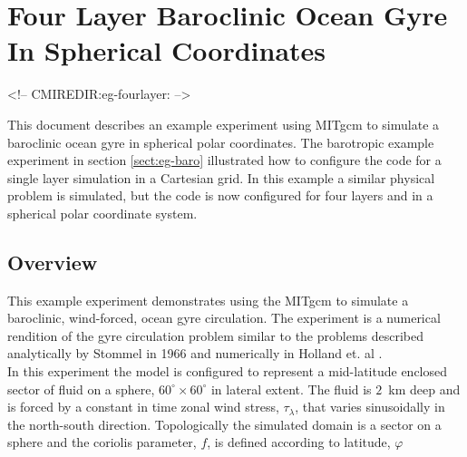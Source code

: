 
\section[Baroclinic Gyre MITgcm Example]{Four Layer Baroclinic Ocean Gyre In Spherical Coordinates}
\label{www:tutorials}
\label{sect:eg-fourlayer}
\begin{rawhtml}
<!-- CMIREDIR:eg-fourlayer: -->
\end{rawhtml}


%
%

This document describes an example experiment using MITgcm
to simulate a baroclinic ocean gyre in spherical
polar coordinates. The barotropic
example experiment in section \ref{sect:eg-baro}
illustrated how to configure the code for a single layer 
simulation in a Cartesian grid. In this example a similar physical problem
is simulated, but the code is now configured
for four layers and in a spherical polar coordinate system.

\subsection{Overview}
\label{www:tutorials}

This example experiment demonstrates using the MITgcm to simulate
a baroclinic, wind-forced, ocean gyre circulation. The experiment 
is a numerical rendition of the gyre circulation problem similar
to the problems described analytically by Stommel in 1966 
\cite{Stommel66} and numerically in Holland et. al \cite{Holland75}.
\\

In this experiment the model is configured to represent a mid-latitude 
enclosed sector of fluid on a sphere, $60^{\circ} \times 60^{\circ}$ in 
lateral extent. The fluid is $2$~km deep and is forced
by a constant in time zonal wind stress, $\tau_{\lambda}$, that varies 
sinusoidally in the north-south direction. Topologically the simulated 
domain is a sector on a sphere and the coriolis parameter, $f$, is defined 
according to latitude, $\varphi$

